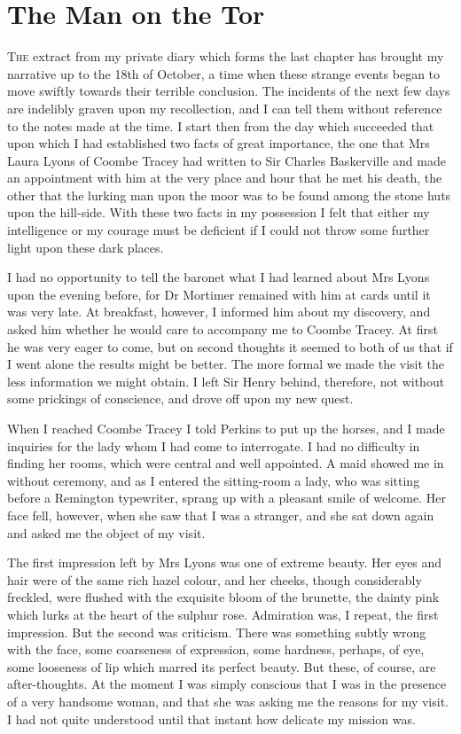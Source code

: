 \chapter{The Man on the Tor}
\lettrine[lines=4]{T}{he} extract from my private diary which forms the last chap\-ter has brought my narrative up to the 18th of October, a time when these strange events began to move swiftly towards their terrible conclusion. The incidents of the next few days are indelibly graven upon my recollection, and I can tell them without reference to the notes made at the time. I start then from the day which succeeded that upon which I had established two facts of great importance, the one that Mrs Laura Lyons of Coombe Tracey had written to Sir Charles Baskerville and made an appointment with him at the very place and hour that he met his death, the other that the lurking man upon the moor was to be found among the stone huts upon the hill-side. With these two facts in my possession I felt that either my intelligence or my courage must be deficient if I could not throw some further light upon these dark places.

I had no opportunity to tell the baronet what I had learned about Mrs Lyons upon the evening before, for Dr Mortimer remained with him at cards until it was very late. At breakfast, however, I informed him about my discovery, and asked him whether he would care to accompany me to Coombe Tracey. At first he was very eager to come, but on second thoughts it seemed to both of us that if I went alone the results might be better. The more formal we made the visit the less information we might obtain. I left Sir Henry behind, therefore, not without some prickings of conscience, and drove off upon my new quest.

When I reached Coombe Tracey I told Perkins to put up the horses, and I made inquiries for the lady whom I had come to interrogate. I had no difficulty in finding her rooms, which were central and well appointed. A maid showed me in without ceremony, and as I entered the sitting-room a lady, who was sitting before a Remington typewriter, sprang up with a pleasant smile of welcome. Her face fell, however, when she saw that I was a stranger, and she sat down again and asked me the object of my visit.

The first impression left by Mrs Lyons was one of extreme beau\-ty. Her eyes and hair were of the same rich hazel colour, and her cheeks, though considerably freckled, were flushed with the exquisite bloom of the brunette, the dainty pink which lurks at the heart of the sulphur rose. Admiration was, I repeat, the first impression. But the second was criticism. There was something subtly wrong with the face, some coarseness of expression, some hardness, perhaps, of eye, some looseness of lip which marred its perfect beauty. But these, of course, are after-thoughts. At the moment I was simply conscious that I was in the presence of a very handsome woman, and that she was asking me the reasons for my visit. I had not quite understood until that instant how delicate my mission was.

